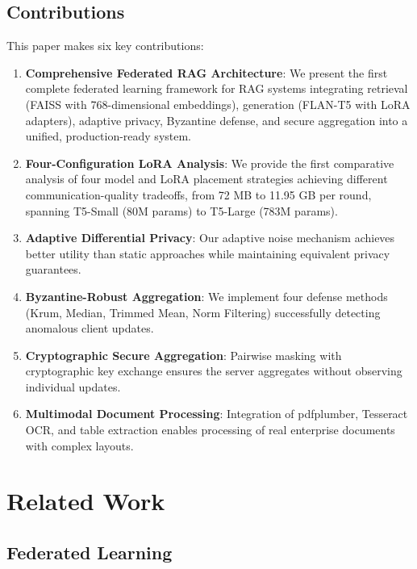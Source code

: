 \documentclass[conference]{IEEEtran}
\begin{document}
\subsection{Contributions}

This paper makes six key contributions:

\begin{enumerate}
    \item \textbf{Comprehensive Federated RAG Architecture}: We present the first complete federated learning framework for RAG systems integrating retrieval (FAISS with 768-dimensional embeddings), generation (FLAN-T5 with LoRA adapters), adaptive privacy, Byzantine defense, and secure aggregation into a unified, production-ready system.
    
    \item \textbf{Four-Configuration LoRA Analysis}: We provide the first comparative analysis of four model and LoRA placement strategies achieving different communication-quality tradeoffs, from 72 MB to 11.95 GB per round, spanning T5-Small (80M params) to T5-Large (783M params).
    
    \item \textbf{Adaptive Differential Privacy}: Our adaptive noise mechanism achieves better utility than static approaches while maintaining equivalent privacy guarantees.
    
    \item \textbf{Byzantine-Robust Aggregation}: We implement four defense methods (Krum, Median, Trimmed Mean, Norm Filtering) successfully detecting anomalous client updates.
    
    \item \textbf{Cryptographic Secure Aggregation}: Pairwise masking with cryptographic key exchange ensures the server aggregates without observing individual updates.
    
    \item \textbf{Multimodal Document Processing}: Integration of pdfplumber, Tesseract OCR, and table extraction enables processing of real enterprise documents with complex layouts.
\end{enumerate}

\section{Related Work}

\subsection{Federated Learning}
\end{document}
